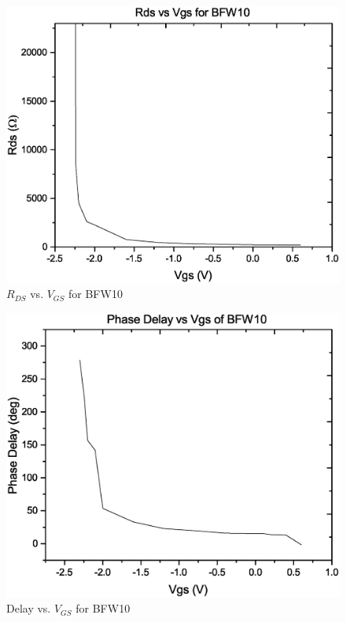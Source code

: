 \documentclass[10pt, conference]{IEEEtran}
\begin{document}
\begin{figure}[htbp]
    \centering
    \includegraphics[width=\columnwidth]{rds_vs_vgs.eps}
    \caption{$R_{DS}$ vs. $V_{GS}$ for BFW10}
    \label{fig:rds_vs_vgs}
\end{figure}

\begin{figure}[htbp]
    \centering
    \includegraphics[width=\columnwidth]{Delay_vs_VT.eps}
    \caption{Delay vs. $V_{GS}$ for BFW10}
    \label{fig:rds_vs_VT}
\end{figure}
\end{document}
